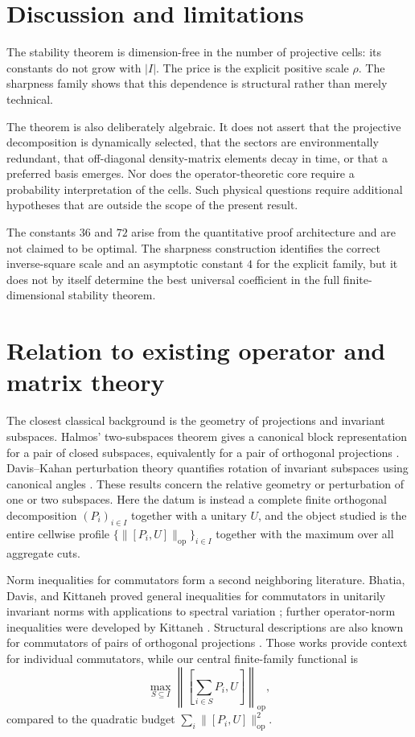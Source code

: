 \documentclass[11pt]{article}
\newcommand{\op}{\mathrm{op}}
\begin{document}
\section{Discussion and limitations}

The stability theorem is dimension-free in the number of projective cells:
its constants do not grow with $|I|$.  The price is the explicit positive
scale $\rho$.  The sharpness family shows that this dependence is structural
rather than merely technical.

The theorem is also deliberately algebraic.  It does not assert that the
projective decomposition is dynamically selected, that the sectors are
environmentally redundant, that off-diagonal density-matrix elements decay
in time, or that a preferred basis emerges.  Nor does the operator-theoretic
core require a probability interpretation of the cells.  Such physical
questions require additional hypotheses that are outside the scope of the
present result.

The constants $36$ and $72$ arise from the quantitative proof architecture
and are not claimed to be optimal.  The sharpness construction identifies the
correct inverse-square scale and an asymptotic constant $4$ for the explicit
family, but it does not by itself determine the best universal coefficient in
the full finite-dimensional stability theorem.

\section{Relation to existing operator and matrix theory}
\label{sec:related}

The closest classical background is the geometry of projections and invariant
subspaces.  Halmos' two-subspaces theorem gives a canonical block
representation for a pair of closed subspaces, equivalently for a pair of
orthogonal projections \cite{Halmos1969TwoSubspaces}.  Davis--Kahan
perturbation theory quantifies rotation of invariant subspaces using canonical
angles \cite{DavisKahan1970}.  These results concern the relative geometry or
perturbation of one or two subspaces.  Here the datum is instead a complete
finite orthogonal decomposition $(P_i)_{i\in I}$ together with a unitary $U$,
and the object studied is the entire cellwise profile
$\{\|[P_i,U]\|_{\op}\}_{i\in I}$ together with the maximum over all aggregate
cuts.

Norm inequalities for commutators form a second neighboring literature.
Bhatia, Davis, and Kittaneh proved general inequalities for commutators in
unitarily invariant norms with applications to spectral variation
\cite{BhatiaDavisKittaneh1991}; further operator-norm inequalities were
developed by Kittaneh \cite{Kittaneh2007}.  Structural descriptions are also
known for commutators of pairs of orthogonal projections
\cite{Li2004}.  Those works provide context for individual commutators, while
our central finite-family functional is
\[
  \max_{S\subseteq I}
  \left\|
    \left[\sum_{i\in S}P_i,U\right]
  \right\|_{\op},
\]
compared to the quadratic budget
$\sum_i\|[P_i,U]\|_{\op}^2$.
\end{document}
